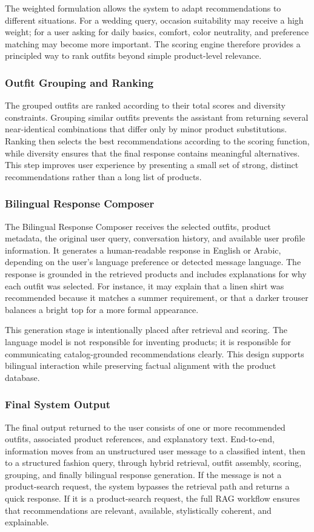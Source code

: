 The weighted formulation allows the system to adapt recommendations to different situations. For a wedding query, occasion suitability may receive a high weight; for a user asking for daily basics, comfort, color neutrality, and preference matching may become more important. The scoring engine therefore provides a principled way to rank outfits beyond simple product-level relevance.

\subsubsection*{Outfit Grouping and Ranking}
The grouped outfits are ranked according to their total scores and diversity constraints. Grouping similar outfits prevents the assistant from returning several near-identical combinations that differ only by minor product substitutions. Ranking then selects the best recommendations according to the scoring function, while diversity ensures that the final response contains meaningful alternatives. This step improves user experience by presenting a small set of strong, distinct recommendations rather than a long list of products.

\subsubsection*{Bilingual Response Composer}
The Bilingual Response Composer receives the selected outfits, product metadata, the original user query, conversation history, and available user profile information. It generates a human-readable response in English or Arabic, depending on the user's language preference or detected message language. The response is grounded in the retrieved products and includes explanations for why each outfit was selected. For instance, it may explain that a linen shirt was recommended because it matches a summer requirement, or that a darker trouser balances a bright top for a more formal appearance.

This generation stage is intentionally placed after retrieval and scoring. The language model is not responsible for inventing products; it is responsible for communicating catalog-grounded recommendations clearly. This design supports bilingual interaction while preserving factual alignment with the product database.

\subsubsection*{Final System Output}
The final output returned to the user consists of one or more recommended outfits, associated product references, and explanatory text. End-to-end, information moves from an unstructured user message to a classified intent, then to a structured fashion query, through hybrid retrieval, outfit assembly, scoring, grouping, and finally bilingual response generation. If the message is not a product-search request, the system bypasses the retrieval path and returns a quick response. If it is a product-search request, the full RAG workflow ensures that recommendations are relevant, available, stylistically coherent, and explainable.

